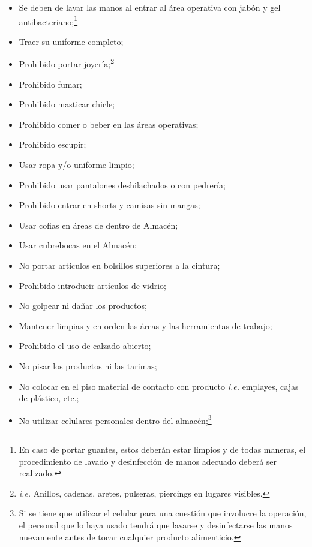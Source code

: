 \begin{center}
        \begin{minipage}{0.9\linewidth}
            \small
            \begin{itemize}
                \item Se deben de lavar las manos al entrar al área operativa con jabón y gel antibacteriano;\footnote{En caso de portar guantes, estos deberán estar limpios y de todas maneras, el procedimiento de lavado y desinfección de manos adecuado deberá ser realizado.}
                \item Traer su uniforme completo;
                \item Prohibido portar joyería;\footnote{\textit{i.e.} Anillos, cadenas, aretes, pulseras, piercings en lugares visibles.}
                \item Prohibido fumar;
                \item Prohibido masticar chicle;
                \item Prohibido comer o beber en las áreas operativas;
                \item Prohibido escupir;
                \item Usar ropa y/o uniforme limpio;
                \item Prohibido usar pantalones deshilachados o con pedrería;
                \item Prohibido entrar en shorts y camisas sin mangas;
                \item Usar cofias en áreas de dentro de Almacén;
                \item Usar cubrebocas en el Almacén;
                \item No portar artículos en bolsillos superiores a la cintura;
                \item Prohibido introducir artículos de vidrio;
                \item No golpear ni dañar los productos;
                \item Mantener limpias y en orden las áreas y las herramientas de trabajo;
                \item Prohibido el uso de calzado abierto;
                \item No pisar los productos ni las tarimas;
                \item No colocar en el piso material de contacto con producto \emph{i.e.} emplayes, cajas de plástico, etc.;
                \item No utilizar celulares personales dentro del almacén;\footnote{Si se tiene que utilizar el celular para una cuestión que involucre la operación, el personal que lo haya usado tendrá que lavarse y desinfectarse las manos nuevamente antes de tocar cualquier producto alimenticio.}

\end{itemize}
\end{minipage}
\end{center}
